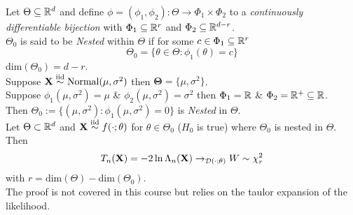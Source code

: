 \documentclass[11pt,a4paper]{article}
\begin{document}
Let $\Theta\subseteq\mathbb{R}^d$ and define $\phi=(\phi_1,\phi_2):\Theta\to\Phi_1\times\Phi_2$ to a \textit{continuously differentiable bijection} with $\Phi_1\subseteq\mathbb{R}^r$ and $\Phi_2\subseteq\mathbb{R}^{d-r}$.\\
$\Theta_0$ is said to be \textit{Nested} within $\Theta$ if for some $c\in\Phi_1\subseteq\mathbb{R}^r$
$$\Theta_0=\{\theta\in\Theta:\phi_1(\theta)=c\}$$
\nb $\text{dim}(\Theta_0)=d-r$.\\

Suppose $\textbf{X}\overset{\text{iid}}{\sim}\text{Normal}(\mu,\sigma^2)$ then $\pmb\Theta=\{\mu,\sigma^2\}$.\\
Suppose $\phi_1(\mu,\sigma^2)=\mu$ \& $\phi_2(\mu,\sigma^2)=\sigma^2$ then $\Phi_1=\mathbb{R}$ \& $\Phi_2=\mathbb{R}^+\subseteq\mathbb{R}$.\\
Then $\Theta_0:=\{(\mu,\sigma^2):\phi_1(\mu,\sigma^2)=0\}$ is \textit{Nested} in $\Theta$.\\

Let $\Theta\subset\mathbb{R}^d$ and $\textbf{X}\overset{\text{iid}}{\sim} f(\cdot;\theta)$ for $\theta\in\Theta_0$ (\ie $H_0$ is true) where $\Theta_0$ is nested in $\Theta$. Then
$$T_n(\textbf{X})=-2\ln\Lambda_n(\textbf{X})\to_{\mathcal{D}(\cdot;\theta)}W\sim\chi^2_r$$
with $r=\text{dim}(\Theta)-\text{dim}(\Theta_0)$.\\
\nb The proof is not covered in this course but relies on the taulor expansion of the likelihood.\\

\end{document}
